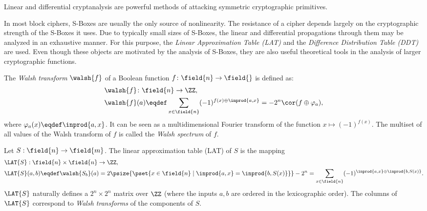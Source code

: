 
Linear and differential cryptanalysis are powerful methods of attacking symmetric cryptographic primitives. 

In most block ciphers, S-Boxes are usually the only source of nonlinearity. The resistance of a cipher depends largely on the cryptographic strength of the S-Boxes it uses. Due to typically small sizes of S-Boxes, the linear and differential propagations through them may be analyzed in an exhaustive manner. For this purpose, the \emph{Linear Approximation Table (LAT)} and the \emph{Difference Distribution Table (DDT)} are used. Even though these objects are motivated by the analysis of S-Boxes, they are also useful theoretical tools in the analysis of larger cryptographic functions.

\begin{definition}
The \emph{Walsh transform} $\walsh{f}$ of a Boolean function $f\colon \field{n} \to \field{}$ is defined as:
\begin{align*}
    & \walsh{f}\colon \field{n} \to \ZZ,\\
    & \walsh{f}(a) \eqdef \sum_{x \in \field{n}} (-1)^{f(x)\oplus \inprod{a,x}} = -2^n \cor(f \oplus \varphi_a),
\end{align*}
where $\varphi_a(x) \eqdef \inprod{a,x}$. It can be seen as a multidimensional Fourier transform of the function $x \mapsto (-1)^{f(x)}$. The multiset of all values of the Walsh transform of $f$ is called the \emph{Walsh spectrum} of $f$.
\end{definition}

\begin{definition}
Let $S: \field{n} \to \field{m}$. The linear approximation table (LAT) of $S$ is the mapping
\begin{align*}
& \LAT{S}: \field{n}\times\field{n} \to \ZZ,\\    
& \LAT{S}(a,b) \eqdef \walsh{S_b}(a) = 2\psize{\pset{x \in \field{n} \mid \inprod{a,x} = \inprod{b,S(x)} }} - 2^{n}
= \sum_{x \in \field{n}} (-1)^{\inprod{a,x} \oplus \inprod{b,S(x)}}
.
\end{align*}
$\LAT{S}$ naturally defines a $2^n \times 2^n$ matrix over $\ZZ$ (where the inputs $a,b$ are ordered in the lexicographic order). The columns of $\LAT{S}$ correspond to \emph{Walsh transforms} of the components of $S$.
\end{definition}

